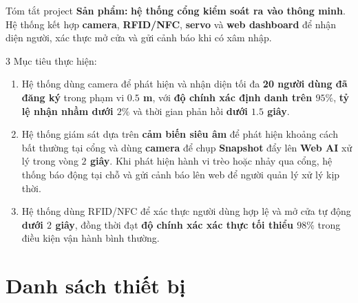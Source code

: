\documentclass[aspectratio=169]{beamer}
\begin{document}
\begin{frame}{Tóm tắt project}
  \textbf{Sản phẩm:} \textbf{hệ thống cổng kiểm soát ra vào thông minh}. Hệ thống kết hợp \textbf{camera}, \textbf{RFID/NFC}, \textbf{servo} và \textbf{web dashboard} để nhận diện người, xác thực mở cửa và gửi cảnh báo khi có xâm nhập.

  \vspace{0.8em}
  3 Mục tiêu thực hiện:
  \begin{enumerate}
    \item Hệ thống dùng camera để phát hiện và nhận diện tối đa \textbf{20 người dùng đã đăng ký} trong phạm vi \textbf{$0.5$ m}, với \textbf{độ chính xác định danh trên $95\%$}, \textbf{tỷ lệ nhận nhầm dưới $2\%$} và thời gian phản hồi \textbf{dưới $1.5$ giây}.
    \item Hệ thống giám sát dựa trên \textbf{cảm biến siêu âm} để phát hiện khoảng cách bất thường tại cổng và dùng \textbf{camera} để chụp \textbf{Snapshot} đẩy lên \textbf{Web AI} xử lý trong vòng \textbf{$2$ giây}. Khi phát hiện hành vi trèo hoặc nhảy qua cổng, hệ thống báo động tại chỗ và gửi cảnh báo lên web để người quản lý xử lý kịp thời.
    \item Hệ thống dùng RFID/NFC để xác thực người dùng hợp lệ và mở cửa tự động \textbf{dưới $2$ giây}, đồng thời đạt \textbf{độ chính xác xác thực tối thiểu $98\%$} trong điều kiện vận hành bình thường.
  \end{enumerate}
\end{frame}

\section{Danh sách thiết bị}
\end{document}
